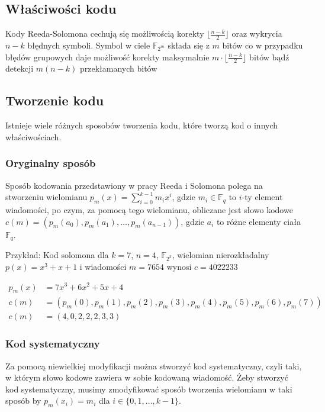 \subsection{Właściwości kodu}
Kody Reeda-Solomona cechują się możliwością korekty $\lfloor \frac{n-k}{2} \rfloor$
oraz wykrycia $n-k$ błędnych symboli. Symbol w ciele $\mathbb{F}_{2^m}$ składa się
z $m$ bitów co w przypadku błędów grupowych daje możliwość korekty maksymalnie
$m \cdot \lfloor \frac{n-k}{2} \rfloor$ bitów bądź detekcji $m(n-k)$ przekłamanych
bitów

\subsection{Tworzenie kodu}
Istnieje wiele różnych sposobów tworzenia kodu, które tworzą kod o innych właściwościach.


\subsubsection{Oryginalny sposób}\label{subsection:original}
Sposób kodowania przedstawiony w pracy Reeda i Solomona polega na stworzeniu
wielomianu $p_m(x)=\sum_{i=0}^{k-1}m_{i}x^i$, gdzie $m_i\in\mathbb{F}_q$ to
$i$\nobreakdash-ty element wiadomości, po czym, za pomocą tego wielomianu,
obliczane jest słowo kodowe $c(m)=(p_m(a_0), p_m(a_1), \ldots, p_m(a_{n-1}))$,
gdzie $a_i$ to różne elementy ciała $\mathbb{F}_q$.
\newline\newline
\begin{minipage}{\textwidth}
Przykład:
\newline
Kod solomona dla $k=7$, $n=4$, $\mathbb{F}_{2^3}$, wielomian nierozkładalny $p(x) = x^3 + x + 1$ i wiadomości $m = 7654$ wynosi $c = 4022233$
\end{minipage}
\begin{align*}
    p_m(x) &= 7x^3 + 6x^2 + 5x + 4 \\
    c(m) &= (p_m(0), p_m(1), p_m(2), p_m(3), p_m(4), p_m(5), p_m(6), p_m(7)) \\
    c(m) &= (4, 0, 2, 2, 2, 3, 3)
\end{align*}

\subsubsection{Kod systematyczny}\label{subsection:Kod systematyczny}
Za pomocą niewielkiej modyfikacji można stworzyć kod systematyczny, czyli taki, w
którym słowo kodowe zawiera w sobie kodowaną wiadomość.
Żeby stworzyć kod systematyczny, musimy zmodyfikować sposób tworzenia wielomianu w
taki sposób by $p_m(x_i)=m_i$ dla $i \in \{0,1,\ldots,k-1\}$.

